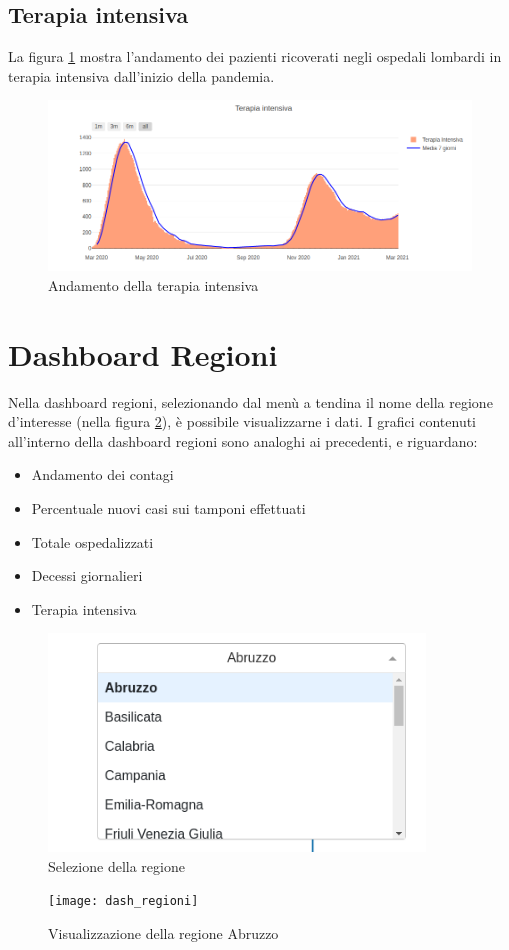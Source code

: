 \subsection{Terapia intensiva}
La figura \ref{fig:ti_lomb} mostra l'andamento dei pazienti ricoverati negli ospedali lombardi in terapia intensiva dall'inizio della pandemia.
\begin{figure}[htp]
    \centering
    \includegraphics[width=12cm]{img/lomb/ti_lomb.png}
    \caption{Andamento della terapia intensiva}
    \label{fig:ti_lomb}
\end{figure}

\section{Dashboard Regioni}
Nella dashboard regioni, selezionando dal menù a tendina il nome della regione d'interesse (nella figura \ref{fig:tendina}), è possibile visualizzarne i dati.
I grafici contenuti all’interno della dashboard regioni sono analoghi ai precedenti, e riguardano:
\begin{itemize}
\item Andamento dei contagi
\item Percentuale nuovi casi sui tamponi effettuati
\item Totale ospedalizzati
\item Decessi giornalieri
\item Terapia intensiva
\end{itemize}
\begin{figure}[htp]
    \centering
    \includegraphics[width=10cm]{img/tendina_regioni.png}
    \caption{Selezione della regione}
    \label{fig:tendina}
\end{figure}

\begin{figure}[htp]
    \centering
    \texttt{[image: dash\_regioni]}
    \caption{Visualizzazione della regione Abruzzo}
    \label{fig:dash_regioni}
\end{figure}